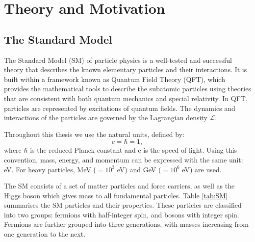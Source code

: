 \documentclass[thesis.tex]{subfiles}
\begin{document}
\chapter{Theory and Motivation}
\label{ch1}

\section{The Standard Model}
The Standard Model (SM) of particle physics is a well-tested and successful theory that describes the known elementary particles and their interactions. 
It is built within a framework known as Quantum Field Theory (QFT), which provides the mathematical tools to describe the subatomic particles using theories that are consistent with both quantum mechanics and special relativity. 
In QFT, particles are represented by excitations of quantum fields. 
The dynamics and interactions of the particles are governed by the Lagrangian density $\mathcal{L}$.

Throughout this thesis we use the natural units, defined by:
\begin{equation}
	c = \hbar = 1,
\end{equation}
where $\hbar$ is the reduced Planck constant and c is the speed of light. 
Using this convention, mass, energy, and momentum can be expressed with the same unit: eV.
For heavy particles, MeV ($=10^3$ eV) and GeV ($=10^6$ eV) are used.

The SM consists of a set of matter particles and force carriers, as well as the Higgs boson which gives mass to all fundamental particles. 
Table \ref{tab:SM} summarises the SM particles and their properties.
These particles are classified into two groups: fermions with half-integer spin, and bosons with integer spin.
Fermions are further grouped into three generations, with masses increasing from one generation to the next. 
\end{document}
